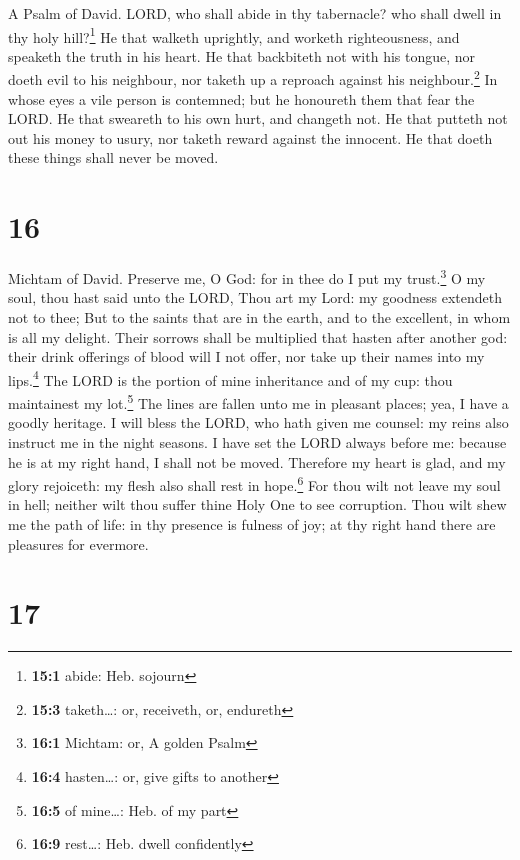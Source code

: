 A Psalm of David.  LORD, who shall abide in thy
tabernacle? who shall dwell in thy holy hill?\footnote{\textbf{15:1}
  abide: Heb. sojourn}  He that walketh uprightly, and
worketh righteousness, and speaketh the truth in his heart.
 He that backbiteth not with his tongue, nor doeth evil to
his neighbour, nor taketh up a reproach against his
neighbour.\footnote{\textbf{15:3} taketh\ldots: or, receiveth, or,
  endureth}  In whose eyes a vile person is contemned; but
he honoureth them that fear the LORD. He that sweareth to his own hurt,
and changeth not.  He that putteth not out his money to
usury, nor taketh reward against the innocent. He that doeth these
things shall never be moved.

\hypertarget{section-15}{%
\section{16}\label{section-15}}

Michtam of David.  Preserve me, O God: for in thee do I
put my trust.\footnote{\textbf{16:1} Michtam: or, A golden Psalm}
 O my soul, thou hast said unto the LORD, Thou art my
Lord: my goodness extendeth not to thee;  But to the
saints that are in the earth, and to the excellent, in whom is all my
delight.  Their sorrows shall be multiplied that hasten
after another god: their drink offerings of blood will I not offer, nor
take up their names into my lips.\footnote{\textbf{16:4} hasten\ldots:
  or, give gifts to another}  The LORD is the portion of
mine inheritance and of my cup: thou maintainest my lot.\footnote{\textbf{16:5}
  of mine\ldots: Heb. of my part}  The lines are fallen
unto me in pleasant places; yea, I have a goodly heritage.
 I will bless the LORD, who hath given me counsel: my
reins also instruct me in the night seasons.  I have set
the LORD always before me: because he is at my right hand, I shall not
be moved.  Therefore my heart is glad, and my glory
rejoiceth: my flesh also shall rest in hope.\footnote{\textbf{16:9}
  rest\ldots: Heb. dwell confidently}  For thou wilt not
leave my soul in hell; neither wilt thou suffer thine Holy One to see
corruption.  Thou wilt shew me the path of life: in thy
presence is fulness of joy; at thy right hand there are pleasures for
evermore.

\hypertarget{section-16}{%
\section{17}\label{section-16}}

